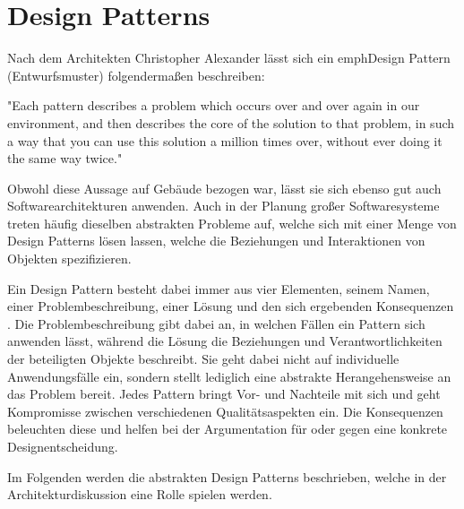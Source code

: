 \section{Design Patterns}

Nach dem Architekten Christopher Alexander lässt sich ein emph{Design Pattern} (Entwurfsmuster) folgendermaßen beschreiben:

"Each pattern describes a problem which occurs over and over again in our environment, and then describes the core of the solution to that problem, in such a way that you can use this solution a million times over, without ever doing it the same way twice." \cite{gamma_design_1995}

Obwohl diese Aussage auf Gebäude bezogen war, lässt sie sich ebenso gut auch Softwarearchitekturen anwenden. Auch in der Planung großer Softwaresysteme treten häufig dieselben abstrakten Probleme auf, welche sich mit einer Menge von Design Patterns lösen lassen, welche die Beziehungen und Interaktionen von Objekten spezifizieren.

Ein Design Pattern besteht dabei immer aus vier Elementen, seinem Namen, einer Problembeschreibung, einer Lösung und den sich ergebenden Konsequenzen \cite{gamma_design_1995}. Die Problembeschreibung gibt dabei an, in welchen Fällen ein Pattern sich anwenden lässt, während die Lösung die Beziehungen und Verantwortlichkeiten der beteiligten Objekte beschreibt. Sie geht dabei nicht auf individuelle Anwendungsfälle ein, sondern stellt lediglich eine abstrakte Herangehensweise an das Problem bereit. Jedes Pattern bringt Vor- und Nachteile mit sich und geht Kompromisse zwischen verschiedenen Qualitätsaspekten ein. Die Konsequenzen beleuchten diese und helfen bei der Argumentation für oder gegen eine konkrete Designentscheidung.

Im Folgenden werden die abstrakten Design Patterns beschrieben, welche in der Architekturdiskussion eine Rolle spielen werden.






